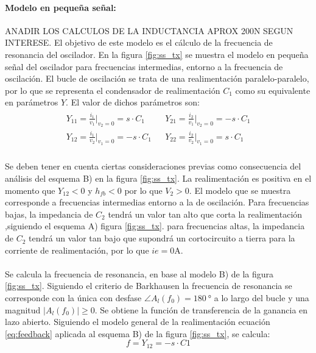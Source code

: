 \paragraph{Modelo en pequeña señal:} ANADIR LOS CALCULOS DE LA INDUCTANCIA APROX 200N SEGUN INTERESE. El objetivo de este modelo es el cálculo de la frecuencia de resonancia del oscilador. En la figura \ref{fig:ss_tx} se muestra el modelo en pequeña señal del oscilador para frecuencias intermedias, entorno a la frecuencia de oscilaci\'on. El bucle de oscilaci\'on se trata de una realimentación paralelo-paralelo, por lo que se representa el condensador de realimentación $C_1$ como su equivalente en par\'ametros $Y$. El valor de dichos par\'ametros son:
\[
\begin{array}{rl} 
      \begin{array}{l}
	 Y_{11} = \frac{i_1}{v_1}|_{v_2 = 0} = s \cdot C_1 \\
	 Y_{12} = \frac{i_1}{v_2}|_{v_1 = 0} = -s \cdot C_1 
      \end{array}
      &
      \begin{array}{l}
	 Y_{21} = \frac{i_2}{v_1}|_{v_2 = 0} = -s \cdot C_1 \\
	 Y_{22} = \frac{i_2}{v_2}|_{v_1 = 0} = s \cdot C_1 
      \end{array}
\end{array}
\]
\paragraph{}
Se deben tener en cuenta ciertas consideraciones previas como consecuencia del an\'alisis del esquema B) en la figura \ref{fig:ss_tx}. La realimentaci\'on es positiva en el momento que $Y_{12}<0$ y $h_{fb}<0$ por lo que $V_2>0$. El modelo que se muestra corresponde a frecuencias intermedias entorno a la de oscilaci\'on. Para frecuencias bajas, la impedancia de $C_2$ tendrá un valor tan alto que corta la realimentación ,siguiendo el esquema A) figura \ref{fig:ss_tx}. para frecuencias altas, la impedancia de $C_2$ tendr\'a un valor tan bajo que supondr\'a un cortocircuito a tierra para la corriente de realimentaci\'on, por lo que $ie = 0 \unit{\ampere}$.
\paragraph{}
Se calcula la frecuencia de resonancia, en base al modelo B) de la figura \ref{fig:ss_tx}. Siguiendo el criterio de Barkhausen la frecuencia de resonancia se corresponde con la única con desfase $\angle A_l(f_0) = \SI{180}{\degree}$ a lo largo del bucle y una magnitud $|A_l(f_0)|\ge 0$. Se obtiene la funci\'on de transferencia de la ganancia en lazo abierto.
Siguiendo el modelo general de la realimentaci\'on ecuaci\'on \ref{eq:feedback} aplicada al esquema B) de la figura \ref{fig:ss_tx}, se calcula: 
\begin{equation}
f = Y_{12} = -s \cdot C1 
\end{equation}
